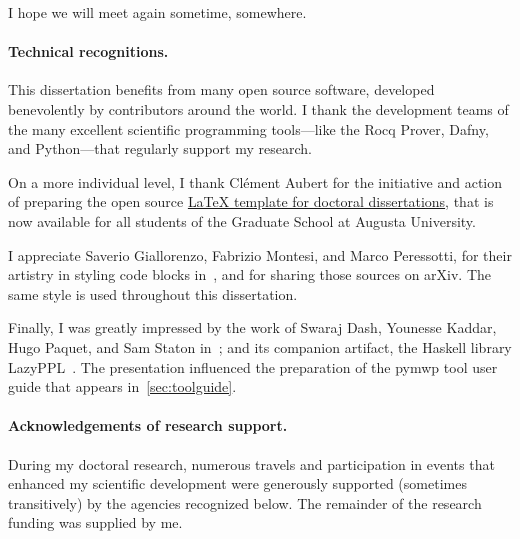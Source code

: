 I hope we will meet again sometime, somewhere.

\paragraph*{Technical recognitions.}
This dissertation benefits from many open source software, developed benevolently by contributors around the world.
I thank the development teams of the many excellent scientific programming tools---like the Rocq Prover, Dafny, and Python---that regularly support my research.

On a more individual level,
I thank Clément Aubert for the initiative and action of preparing the open source \href{https://github.com/the-au-forml-lab/au_ccs_dissertation_template}{LaTeX
template for doctoral dissertations}, that is now available for all students of the Graduate School at Augusta University.

I appreciate Saverio Giallorenzo, Fabrizio Montesi, and Marco Peressotti, for their artistry in styling code blocks in~\cite{giallorenzo2024},
and for sharing those sources on arXiv.
The same style is used throughout this dissertation.

Finally, I was greatly impressed by the work of Swaraj Dash, Younesse Kaddar, Hugo Paquet, and Sam Staton in~\cite{dash2023};
and its companion artifact, the Haskell library LazyPPL~\cite{dash2023b}.
The presentation influenced the preparation of the pymwp tool user guide that appears in~\autoref{sec:toolguide}.

\paragraph*{Acknowledgements of research support.}
During my doctoral research, numerous travels and participation in events that enhanced my scientific development were generously supported (sometimes transitively) by the agencies recognized below.
The remainder of the research funding was supplied by me.


